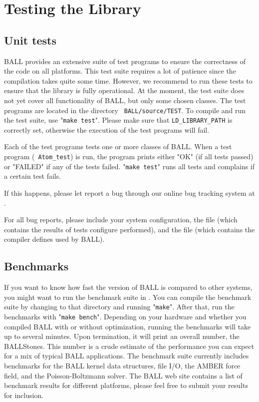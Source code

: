 \section{Testing the Library}

\subsection{Unit tests}

BALL provides an extensive suite of test programs to ensure the correctness of
the code on all platforms. This test suite requires a lot of patience since
the compilation takes quite some time. However, we recommend to run these
tests to ensure that the library is fully operational. At the moment, the test
suite does not yet cover all functionality of BALL, but only some chosen
classes.  The test programs are located in the directory {\tt
BALL/source/TEST}.  To compile and run the test suite, use "{\tt make test}".
Please make sure that {\tt LD\_LIBRARY\_PATH} is correctly set, otherwise the
execution of the test programs will fail.

Each of the test programs tests one or more classes of BALL. When a test
program (\eg~{\tt Atom\_test}) is run, the program prints either "OK" (if all
tests passed) or "FAILED" if any of the tests failed. "{\tt make test}" runs
all tests and complains if a certain test fails.  


If this happens, please let report a bug through our online bug tracking
system at .

\noindent
For all bug reports, please include your system configuration, the file
 (which contains the results of tests configure performed),
and the file  (which contains the compiler
defines used by BALL).

\subsection{Benchmarks}

If you want to know how fast the version of BALL is compared to other systems,
you might want to run the benchmark suite in .
You can compile the benchmark suite by changing to that directory and running
"{\tt make}". After that, run the benchmarks with "{\tt make bench}".
Depending on your hardware and whether you compiled BALL with or without
optimization, running the benchmarks will take up to several minutes. Upon
termination, it will print an overall number, the BALLStones. This number is a
crude estimate of the performance you can expect for a mix of typical BALL
applications. The benchmark suite currently includes benchmarks for the BALL
kernel data structures, file I/O, the AMBER force field, and the
Poisson-Boltzmann solver. The BALL web site contains a list of benchmark
results for different platforms, please feel free to submit your results for
inclusion.
